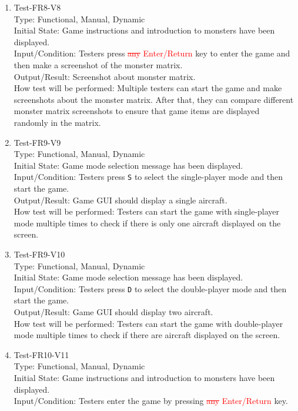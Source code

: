 \documentclass[12pt]{article}
\begin{document}
\begin{enumerate}[1.]
\item Test-FR8-V8\\
Type: Functional, Manual, Dynamic\\
Initial State: Game instructions and introduction to 
monsters have been displayed.\\
Input/Condition: Testers press \textcolor{red}{\st{any} Enter/Return} key to enter
the game and then make a screenshot of the monster
matrix.\\
Output/Result: Screenshot about monster matrix.\\
How test will be performed: Multiple testers can start
the game and make screenshots about the monster matrix.
After that, they can compare different monster matrix
screenshots to ensure that game items are displayed 
randomly in the matrix.
\item Test-FR9-V9\\
Type: Functional, Manual, Dynamic\\
Initial State: Game mode selection message has been
displayed.\\
Input/Condition: Testers press \verb|S| to select the
single-player mode and then start the game.\\
Output/Result: Game GUI should display a single aircraft.\\
How test will be performed: Testers can start the game 
with single-player mode multiple times to check if there
is only one aircraft displayed on the screen.
\newpage
\item Test-FR9-V10\\
Type: Functional, Manual, Dynamic\\
Initial State: Game mode selection message has been
displayed.\\
Input/Condition: Testers press \verb|D| to select the
double-player mode and then start the game.\\
Output/Result: Game GUI should display two aircraft.\\
How test will be performed: Testers can start the game 
with double-player mode multiple times to check if there
are aircraft displayed on the screen.
\item Test-FR10-V11\\
Type: Functional, Manual, Dynamic\\
Initial State: Game instructions and introduction to 
monsters have been displayed.\\
Input/Condition: Testers enter the game by pressing \textcolor{red}{\st{any} Enter/Return}
key.\\

\end{enumerate}
\end{document}
